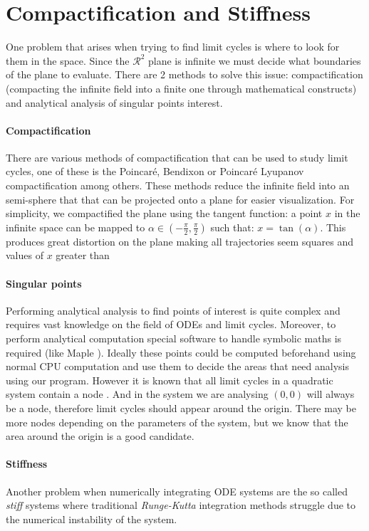 
\section{Compactification and Stiffness}%
\label{sec:compact-stiff}

One problem that arises when trying to find limit cycles is where to look for
them in the space. Since the $\mathcal{R}^2$ plane is infinite we must decide
what boundaries of the plane to evaluate. There are 2 methods to solve this
issue: compactification (compacting the infinite field into a finite one through
mathematical constructs) and analytical analysis of singular points interest.

\paragraph{Compactification}
There are various methods of compactification that can be used to study
limit cycles, one of these is the Poincaré, Bendixon or
Poincaré Lyupanov compactification
\cite{poincare_sur_1891,bendixson_sur_1901,dumortier_poincare_2006,noauthor_fig_nodate}
among others.  These methods reduce the infinite field into an semi-sphere that
that can be projected onto a plane for easier visualization. For simplicity, we
compactified the plane using the tangent function: a point $x$ in the infinite
space can be mapped to $\alpha \in \left(-\frac{\pi}{2}, \frac{\pi}{2}\right)$
such that: $x = \tan(\alpha)$. This produces great distortion on the plane
making all trajectories seem squares and values of $x$ greater than

\paragraph{Singular points}
Performing analytical analysis to find points of interest is quite complex and
requires vast knowledge on the field of ODEs and limit cycles. Moreover, to
perform analytical computation special software to handle symbolic maths is
required (like Maple \cite{noauthor_maple_nodate}). Ideally these points could
be computed beforehand using normal CPU computation and use them to decide the
areas that need analysis using our program. However it is known that all limit
cycles in a quadratic system contain a node \cite{cherkas_quadratic_2003}. And
in the system we are analysing $(0,0)$ will always be a node, therefore limit
cycles should appear around the origin. There may be more nodes
depending on the parameters of the system, but we know that the area around the
origin is a good candidate.

\paragraph{Stiffness}
Another problem when numerically integrating ODE systems are the so called
\emph{stiff} systems where traditional \emph{Runge-Kutta} integration methods
struggle due to the numerical instability of the system.

